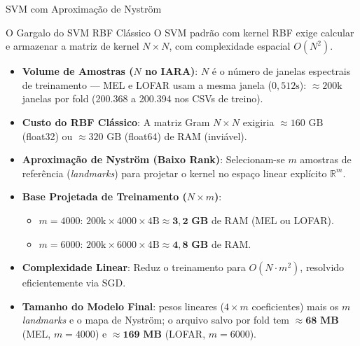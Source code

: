\documentclass[aspectratio=169]{beamer}
\begin{document}
\begin{frame}{SVM com Aproxima\c{c}\~{a}o de Nystr\"{o}m}
    \scriptsize
    \begin{block}{O Gargalo do SVM RBF Cl\'{a}ssico}
        O SVM padr\~{a}o com kernel RBF exige calcular e armazenar a matriz de kernel $N \times N$, com complexidade espacial $O(N^2)$.
        \begin{itemize}
            \scriptsize
            \item \textbf{Volume de Amostras ($N$ no IARA)}: $N$ \'{e} o n\'{u}mero de janelas espectrais de treinamento — MEL e LOFAR usam a mesma janela ($0,512\text{s}$): $\approx 200\text{k}$ janelas por fold (200.368 a 200.394 nos CSVs de treino).
            \item \textbf{Custo do RBF Cl\'{a}ssico}: A matriz Gram $N \times N$ exigiria $\approx 160\text{ GB}$ (float32) ou $\approx 320\text{ GB}$ (float64) de RAM (invi\'{a}vel).
        \end{itemize}
    \end{block}

    \scriptsize
    \begin{itemize}
        \setlength{\itemsep}{2pt}
        \item \textbf{Aproxima\c{c}\~{a}o de Nystr\"{o}m (Baixo Rank)}: Selecionam-se $m$ amostras de refer\^{e}ncia (\textit{landmarks}) para projetar o kernel no espa\c{c}o linear expl\'{i}cito $\mathbb{R}^m$.
        \item \textbf{Base Projetada de Treinamento ($N \times m$)}:
        \begin{itemize}
            \tiny
            \setlength{\itemsep}{1pt}
            \item $m=4000$: $200\text{k} \times 4000 \times 4\text{B} \approx \mathbf{3,2\text{ GB}}$ de RAM (MEL ou LOFAR).
            \item $m=6000$: $200\text{k} \times 6000 \times 4\text{B} \approx \mathbf{4,8\text{ GB}}$ de RAM.
        \end{itemize}
        \item \textbf{Complexidade Linear}: Reduz o treinamento para $O(N \cdot m^2)$, resolvido eficientemente via SGD.
        \item \textbf{Tamanho do Modelo Final}: pesos lineares ($4 \times m$ coeficientes) mais os $m$ \textit{landmarks} e o mapa de Nystr\"{o}m; o arquivo salvo por fold tem $\approx \mathbf{68\text{ MB}}$ (MEL, $m=4000$) e $\approx \mathbf{169\text{ MB}}$ (LOFAR, $m=6000$).
    \end{itemize}
\end{frame}
\end{document}
